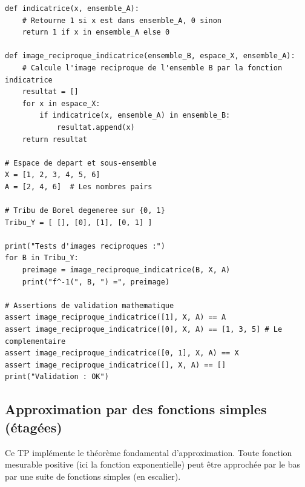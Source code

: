 \documentclass[11pt,a4paper]{article}
\begin{document}
\begin{lstlisting}
def indicatrice(x, ensemble_A):
    # Retourne 1 si x est dans ensemble_A, 0 sinon
    return 1 if x in ensemble_A else 0

def image_reciproque_indicatrice(ensemble_B, espace_X, ensemble_A):
    # Calcule l'image reciproque de l'ensemble B par la fonction indicatrice
    resultat = []
    for x in espace_X:
        if indicatrice(x, ensemble_A) in ensemble_B:
            resultat.append(x)
    return resultat

# Espace de depart et sous-ensemble
X = [1, 2, 3, 4, 5, 6]
A = [2, 4, 6]  # Les nombres pairs

# Tribu de Borel degeneree sur {0, 1}
Tribu_Y = [ [], [0], [1], [0, 1] ]

print("Tests d'images reciproques :")
for B in Tribu_Y:
    preimage = image_reciproque_indicatrice(B, X, A)
    print("f^-1(", B, ") =", preimage)

# Assertions de validation mathematique
assert image_reciproque_indicatrice([1], X, A) == A
assert image_reciproque_indicatrice([0], X, A) == [1, 3, 5] # Le complementaire
assert image_reciproque_indicatrice([0, 1], X, A) == X
assert image_reciproque_indicatrice([], X, A) == []
print("Validation : OK")
\end{lstlisting}


\vspace{0.5cm}

\subsection*{Approximation par des fonctions simples (étagées)}

Ce TP implémente le théorème fondamental d'approximation. Toute fonction mesurable positive (ici la fonction exponentielle) peut être approchée par le bas par une suite de fonctions simples (en escalier).
\end{document}
